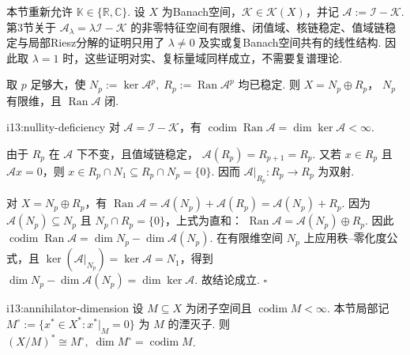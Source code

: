 本节重新允许 \(\displaystyle \mathbb K\in\{\mathbb R,\mathbb C\}\). 设 \(\displaystyle X\) 为Banach空间，\(\displaystyle \mathcal K\in\mathcal K(X)\)，并记
\(\displaystyle \mathcal A := \mathcal I-\mathcal K\).
第3节关于 \(\displaystyle \mathcal A_\lambda=\lambda\mathcal I-\mathcal K\) 的非零特征空间有限维、闭值域、核链稳定、值域链稳定与局部Riesz分解的证明只用了 \(\displaystyle \lambda\neq0\) 及实或复Banach空间共有的线性结构. 因此取 \(\displaystyle \lambda=1\) 时，这些证明对实、复标量域同样成立，不需要复谱理论.

取 \(\displaystyle p\) 足够大，使
\(\displaystyle N_p:=\ker\mathcal A^p, \; R_p:=\operatorname{Ran}\mathcal A^p\)
均已稳定. 则
\(\displaystyle X=N_p\oplus R_p\)，
\(\displaystyle N_p\) 有限维，且 \(\displaystyle \operatorname{Ran}\mathcal A\) 闭.

\begin{FAProposition}[A][零化度与亏维相等]{i13:nullity-deficiency}
对 \(\displaystyle \mathcal A=\mathcal I-\mathcal K\)，有
\(\displaystyle \operatorname{codim}\operatorname{Ran}\mathcal A = \dim\ker\mathcal A <\infty\).
\end{FAProposition}

\begin{FAProof}
由于 \(\displaystyle R_p\) 在 \(\displaystyle \mathcal A\) 下不变，且值域链稳定，
\(\displaystyle \mathcal A(R_p) = R_{p+1} = R_p\).
又若 \(\displaystyle x\in R_p\) 且 \(\displaystyle \mathcal Ax=0\)，则 \(\displaystyle x\in R_p\cap N_1\subseteq R_p\cap N_p=\{0\}\). 因而 \(\displaystyle \mathcal A|_{R_p}:R_p\to R_p\) 为双射.

对 \(\displaystyle X=N_p\oplus R_p\)，有
\(\displaystyle \operatorname{Ran}\mathcal A = \mathcal A(N_p)+\mathcal A(R_p) = \mathcal A(N_p)+R_p\).
因为 \(\displaystyle \mathcal A(N_p)\subseteq N_p\) 且 \(\displaystyle N_p\cap R_p=\{0\}\)，上式为直和：
\(\displaystyle \operatorname{Ran}\mathcal A = \mathcal A(N_p)\oplus R_p\).
因此
\(\displaystyle \operatorname{codim}\operatorname{Ran}\mathcal A = \dim N_p- \dim\mathcal A(N_p)\).
在有限维空间 \(\displaystyle N_p\) 上应用秩--零化度公式，且 \(\displaystyle \ker(\mathcal A|_{N_p})=\ker\mathcal A=N_1\)，得到
\(\displaystyle \dim N_p- \dim\mathcal A(N_p) = \dim\ker\mathcal A\).
故结论成立.
\hfill\(\square\)
\end{FAProof}

\begin{FALemma}[B][有限余维闭子空间的湮灭子维数]{i13:annihilator-dimension}
设 \(\displaystyle M\subseteq X\) 为闭子空间且 \(\displaystyle \operatorname{codim}M<\infty\). 本节局部记
\(\displaystyle M^\circ := \{x^*\in X^*:x^*|_M=0\}\)
为 \(\displaystyle M\) 的湮灭子. 则
\(\displaystyle (X/M)^* \cong M^\circ, \; \dim M^\circ = \operatorname{codim}M\).
\end{FALemma}

